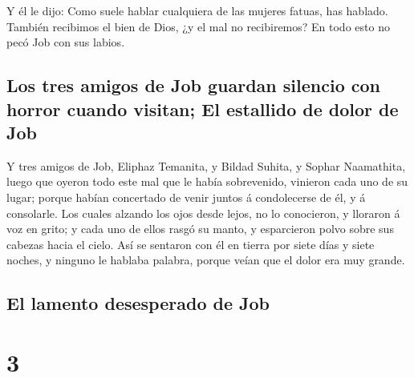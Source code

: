  Y él le dijo: Como suele hablar cualquiera de las
mujeres fatuas, has hablado. También recibimos el bien de Dios, ¿y el
mal no recibiremos? En todo esto no pecó Job con sus labios.

\hypertarget{los-tres-amigos-de-job-guardan-silencio-con-horror-cuando-visitan-el-estallido-de-dolor-de-job}{%
\subsection{Los tres amigos de Job guardan silencio con horror cuando
visitan; El estallido de dolor de
Job}\label{los-tres-amigos-de-job-guardan-silencio-con-horror-cuando-visitan-el-estallido-de-dolor-de-job}}

 Y tres amigos de Job, Eliphaz Temanita, y Bildad Suhita,
y Sophar Naamathita, luego que oyeron todo este mal que le había
sobrevenido, vinieron cada uno de su lugar; porque habían concertado de
venir juntos á condolecerse de él, y á consolarle.  Los
cuales alzando los ojos desde lejos, no lo conocieron, y lloraron á voz
en grito; y cada uno de ellos rasgó su manto, y esparcieron polvo sobre
sus cabezas hacia el cielo.  Así se sentaron con él en
tierra por siete días y siete noches, y ninguno le hablaba palabra,
porque veían que el dolor era muy grande.

\hypertarget{el-lamento-desesperado-de-job}{%
\subsection{El lamento desesperado de
Job}\label{el-lamento-desesperado-de-job}}

\hypertarget{section-2}{%
\section{3}\label{section-2}}

